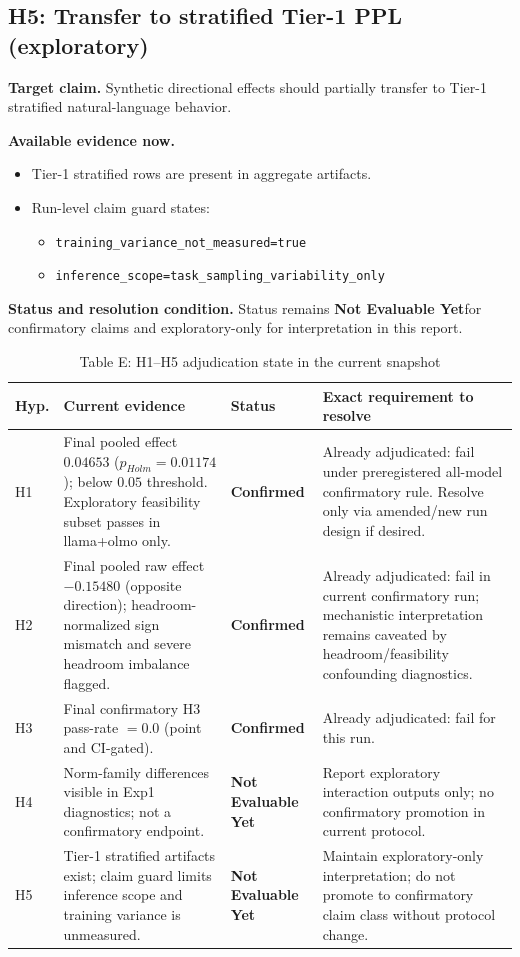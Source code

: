 \documentclass[11pt]{article}
\newcommand{\statusConfirmed}{\textbf{Confirmed}}
\newcommand{\statusNotEval}{\textbf{Not Evaluable Yet}}
\begin{document}
\subsection{H5: Transfer to stratified Tier-1 PPL (exploratory)}
\textbf{Target claim.} Synthetic directional effects should partially transfer to Tier-1 stratified natural-language behavior.

\textbf{Available evidence now.}
\begin{itemize}[leftmargin=*]
  \item Tier-1 stratified rows are present in aggregate artifacts.
  \item Run-level claim guard states:
  \begin{itemize}
    \item \texttt{training\_variance\_not\_measured=true}
    \item \texttt{inference\_scope=task\_sampling\_variability\_only}
  \end{itemize}
\end{itemize}

\textbf{Status and resolution condition.}
Status remains \statusNotEval for confirmatory claims and exploratory-only for interpretation in this report.

\begin{table}[ht]
\centering
\caption{Table E: H1--H5 adjudication state in the current snapshot}
\begin{tabularx}{\textwidth}{L{0.07\textwidth}L{0.30\textwidth}L{0.17\textwidth}Y}
\toprule
\textbf{Hyp.} & \textbf{Current evidence} & \textbf{Status} & \textbf{Exact requirement to resolve} \\
\midrule
H1 & Final pooled effect \(0.04653\) (\(p_{Holm}=0.01174\)); below \(0.05\) threshold. Exploratory feasibility subset passes in llama+olmo only. & \statusConfirmed & Already adjudicated: fail under preregistered all-model confirmatory rule. Resolve only via amended/new run design if desired. \\
H2 & Final pooled raw effect \(-0.15480\) (opposite direction); headroom-normalized sign mismatch and severe headroom imbalance flagged. & \statusConfirmed & Already adjudicated: fail in current confirmatory run; mechanistic interpretation remains caveated by headroom/feasibility confounding diagnostics. \\
H3 & Final confirmatory H3 pass-rate \(=0.0\) (point and CI-gated). & \statusConfirmed & Already adjudicated: fail for this run. \\
H4 & Norm-family differences visible in Exp1 diagnostics; not a confirmatory endpoint. & \statusNotEval & Report exploratory interaction outputs only; no confirmatory promotion in current protocol. \\
H5 & Tier-1 stratified artifacts exist; claim guard limits inference scope and training variance is unmeasured. & \statusNotEval & Maintain exploratory-only interpretation; do not promote to confirmatory claim class without protocol change. \\
\bottomrule
\end{tabularx}
\end{table}
\end{document}
